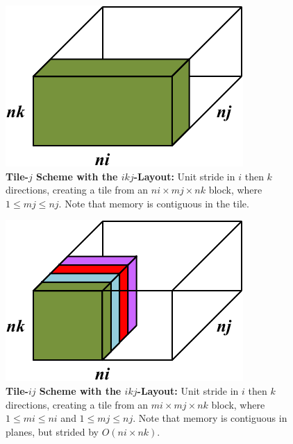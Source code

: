\documentclass{sig-alternate-05-2015}
\begin{document}
\begin{figure}[!bt]
  \centering
  \caption{
    \textbf{Tile-\(j\) Scheme with the \(ikj\)-Layout:}
    Unit stride in \(i\) then \(k\) directions, creating a tile from an 
    \(ni \times mj \times nk \) block, where \(1 \le  mj \le nj \).
    Note that memory is contiguous in the tile.
  }
  \label{fig:implementation:tiling:ikj_layout_tile_j}
  \includegraphics[width=0.70\columnwidth]{figures/ikj_layout_tile_j_scheme.pdf}
  \vspace{-.5cm}
\end{figure}

\begin{figure}[!bt]
  \centering
  \caption{
    \textbf{Tile-\(ij\) Scheme with the \(ikj\)-Layout:}
    Unit stride in \(i\) then \(k\) directions, creating a tile from an 
    \(mi \times mj \times nk \) block, where \(1 \le  mi \le ni \)
    and \(1 \le  mj \le nj \).
    Note that memory is contiguous in planes, but strided by $O(ni \times nk)$.
  }
  \label{fig:implementation:tiling:ikj_layout_tile_ij}
  \includegraphics[width=0.70\columnwidth]{figures/ikj_layout_tile_ij_scheme.pdf}
  \vspace{-.5cm}
\end{figure}
\end{document}
